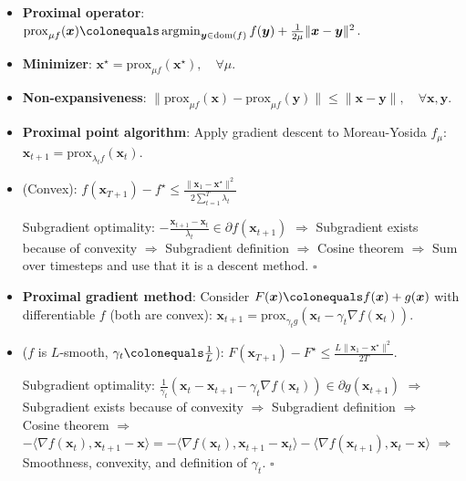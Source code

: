 \documentclass[8pt,a4paper]{extarticle}
\renewcommand{\proof}[1]{\begin{tcolorbox}#1 \hfill $\square$\end{tcolorbox}}
\DeclareMathOperator*{\argmin}{argmin}
\renewcommand{\vec}[1]{\bm{#1}}
\newcommand{\dom}[1]{\mathrm{dom}(#1)}
\newenvironment{topic}[1]
{\textbf{\sffamily \colorbox{black}{\rlap{\textbf{\textcolor{white}{#1}}}\hspace{\linewidth}\hspace{-2\fboxsep}}} \\ \vspace{0.2cm}}
{}
\begin{document}
\begin{multicols*}{2}
    \begin{topic}{Proximal algorithms}
        \begin{itemize}
            \item \textbf{Proximal operator}: $\mathrm{prox}_{\mu f}(\vec{x}) \colonequals \argmin_{\vec{y} \in \dom{f}} f(\vec{y}) + \frac{1}{2 \mu} \| \vec{x} - \vec{y} \|^2$.
            \item \textbf{Minimizer}: $\vec{x}^\star = \mathrm{prox}_{\mu f}(\vec{x}^\star), \quad \forall \mu$.
            \item \textbf{Non-expansiveness}: $\| \mathrm{prox}_{\mu f}(\vec{x}) - \mathrm{prox}_{\mu f}(\vec{y}) \| \leq \| \vec{x} - \vec{y} \|, \quad \forall \vec{x}, \vec{y}$.
            \item \textbf{Proximal point algorithm}: Apply gradient descent to Moreau-Yosida $f_{\mu}$: $\vec{x}_{t+1} = \mathrm{prox}_{\lambda_t f}(\vec{x}_t)$.
            \item (Convex): $f(\vec{x}_{T+1}) - f^\star \leq \frac{\| \vec{x}_1 - \vec{x}^\star \|^2}{2 \sum_{t=1}^{T} \lambda_t}$
                  \proof{Subgradient optimality: $-\frac{\vec{x}_{t+1} - \vec{x}_t}{\lambda_t} \in \partial f(\vec{x}_{t+1})$ $\Rightarrow$ Subgradient exists because of convexity $\Rightarrow$ Subgradient definition $\Rightarrow$ Cosine theorem $\Rightarrow$ Sum over timesteps and use that it is a descent method.}
            \item \textbf{Proximal gradient method}: Consider $F(\vec{x}) \colonequals f(\vec{x}) + g(\vec{x})$ with differentiable $f$ (both are convex): $\vec{x}_{t+1} = \mathrm{prox}_{\gamma_t g}(\vec{x}_t - \gamma_t \nabla f(\vec{x}_t))$.
            \item ($f$ is $L$-smooth, $\gamma_t \colonequals \frac{1}{L}$): $F(\vec{x}_{T+1}) - F^\star \leq \frac{L \| \vec{x}_1 - \vec{x}^\star \|^2}{2T}$.
                  \proof{Subgradient optimality: $\frac{1}{\gamma_t} (\vec{x}_t - \vec{x}_{t+1} - \gamma_t \nabla f(\vec{x}_t)) \in \partial g(\vec{x}_{t+1})$ $\Rightarrow$ Subgradient exists because of convexity $\Rightarrow$ Subgradient definition $\Rightarrow$ Cosine theorem $\Rightarrow$ $- \langle \nabla f(\vec{x}_t), \vec{x}_{t+1} - \vec{x} \rangle = - \langle \nabla f(\vec{x}_t), \vec{x}_{t+1} - \vec{x}_t \rangle - \langle \nabla f(\vec{x}_{t+1}), \vec{x}_t - \vec{x} \rangle$ $\Rightarrow$ Smoothness, convexity, and definition of $\gamma_t$.}
        \end{itemize}
    \end{topic}


\end{multicols*}
\end{document}
